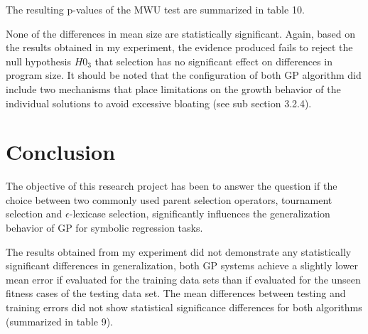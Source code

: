 \documentclass[
  12pt,
]{article}
\begin{document}
The resulting p-values of the MWU test are summarized in table 10.

\begin{table}[!h]

\caption{\label{tab:unnamed-chunk-10}Mean Size - P-Values}
\centering
{}
\end{table}

None of the differences in mean size are statistically significant.
Again, based on the results obtained in my experiment, the evidence
produced fails to reject the null hypothesis \(H0_{3}\) that selection
has no significant effect on differences in program size. It should be
noted that the configuration of both GP algorithm did include two
mechanisms that place limitations on the growth behavior of the
individual solutions to avoid excessive bloating (see sub section
3.2.4).

\hypertarget{conclusion}{%
\section{Conclusion}\label{conclusion}}

The objective of this research project has been to answer the question
if the choice between two commonly used parent selection operators,
tournament selection and \(\epsilon\)-lexicase selection, significantly
influences the generalization behavior of GP for symbolic regression
tasks.

The results obtained from my experiment did not demonstrate any
statistically significant differences in generalization, both GP systems
achieve a slightly lower mean error if evaluated for the training data
sets than if evaluated for the unseen fitness cases of the testing data
set. The mean differences between testing and training errors did not
show statistical significance differences for both algorithms
(summarized in table 9).
\end{document}

